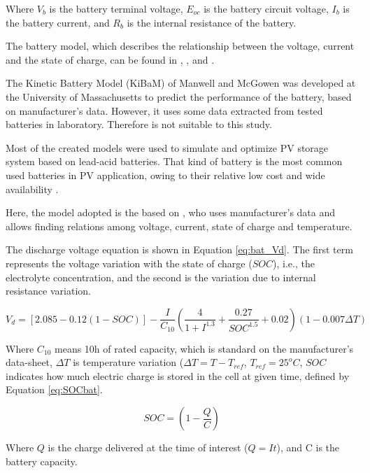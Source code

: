 Where $ V_{b} $ is the battery terminal voltage, $ E_{oc} $ is the battery circuit voltage, $ I_{b} $ is the battery current, and $ R_{b} $ is the internal resistance of the battery.

The battery model, which describes the relationship between the voltage, current and the state of charge, can be found in \cite{Copetti}, \cite{Manwell93}, and \cite{Manwell94}.  

The Kinetic Battery Model (KiBaM) of Manwell and McGowen \cite{Manwell93} was developed at the University of Massachusetts to predict the performance of the battery, based on manufacturer's data. However, it uses some data extracted from tested batteries in laboratory. Therefore is not suitable to this study. 

Most of the created models were used to simulate and optimize PV storage system based on lead-acid batteries. That kind of battery is the most common used batteries in PV application, owing to their relative low cost and wide availability \cite{Copetti}. 

Here, the model adopted is the based on \cite{Copetti}, who uses manufacturer's data and allows finding relations among voltage, current, state of charge and temperature. 

The discharge voltage equation is shown in Equation \ref{eq:bat_Vd}. The first term represents the voltage variation with the state of charge ($ SOC $), i.e., the electrolyte concentration, and the second is the variation due to internal resistance variation.

\begin{equation}
\label{eq:bat_Vd}
V_{d} = \left[ 2.085-0.12(1-SOC) \right] - \dfrac{I}{C_{10}} \left( \dfrac{4}{1+I^{1.3}} + \dfrac{0.27}{SOC^{1.5}}+0.02 \right) (1-0.007 \Delta T)
\end{equation}

Where $ C_{10} $ means 10h of rated capacity, which is standard on the manufacturer's data-sheet, $ \Delta T $ is temperature variation ($ \Delta T=T-T_{ref} $, $ T_{ref}=25^{o}C $, $ SOC $ indicates how much electric charge is stored in the cell at given time, defined by Equation \ref{eq:SOCbat}.

\begin{equation}
\label{eq:SOCbat}
SOC = \left( 1 - \dfrac{Q}{C} \right) 
\end{equation}

Where $ Q $ is the charge delivered at the time of interest ($ Q=It $), and C is the battery capacity.

